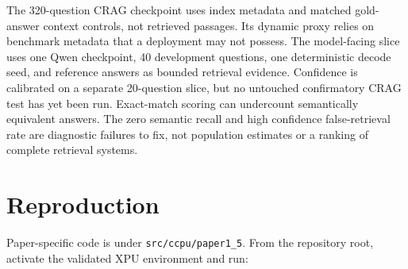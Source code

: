 \documentclass[11pt]{article}
\begin{document}
The 320-question CRAG checkpoint uses index metadata and matched gold-answer
context controls, not retrieved passages. Its dynamic proxy relies on benchmark
metadata that a deployment may not possess. The model-facing slice uses one
Qwen checkpoint, 40 development questions, one deterministic decode seed, and
reference answers as bounded retrieval evidence. Confidence is calibrated on a
separate 20-question slice, but no untouched confirmatory CRAG test has yet been
run. Exact-match scoring can undercount semantically equivalent answers. The
zero semantic recall and high confidence false-retrieval rate are diagnostic
failures to fix, not population estimates or a ranking of complete retrieval
systems.

\section{Reproduction}
Paper-specific code is under \texttt{src/ccpu/paper1\_5}. From the repository
root, activate the validated XPU environment and run:
\end{document}
